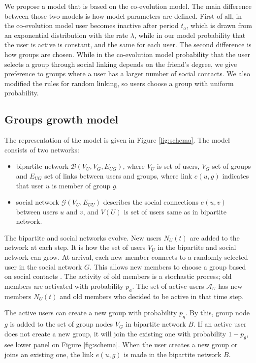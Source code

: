 We propose a model that is based on the co-evolution model. The main difference between those two models is how model parameters are defined. First of all, in the co-evolution model user becomes inactive after period $t_a$, which is drawn from an exponential distribution with the rate $\lambda$, while in our model probability that the user is active is constant, and the same for each user. The second difference is how groups are chosen. While in the co-evolution model probability that the user selects a group through social linking depends on the friend's degree, we give preference to groups where a user has a larger number of social contacts. We also modified the rules for random linking, so users choose a group with uniform probability.

\subsection{Groups growth model}

The representation of the model is given in Figure \ref{fig:schema}. The model consists of two networks:
\begin{itemize}
	\item bipartite network $\mathcal{B}(V_{U}, V_{G}, E_{UG})$, where $V_U$ is set of users, $V_G$ set of groups and $E_{UG}$ set of links between users and groups, where link $e(u,g)$ indicates that user $u$ is member of group $g$.
	\item social network $\mathcal{G}(V_{U},E_{UU})$ describes the social connections $e(u, v)$ between users $u$ and $v$, and  $V(U)$ is set of users same as in bipartite network. 
\end{itemize}

The bipartite and social networks evolve. New users $N_U(t)$ are added to the network at each step. It is how the set of users $V_U$ in the bipartite and social network can grow. At arrival, each new member connects to a randomly selected user in the social network $G$. This allows new members to choose a group based on social contacts \cite{kairam2012life}. The activity of old members is a stochastic process; old members are activated with probability $p_a$. The set of active users $\mathcal{A}_{U}$ has new members $N_U(t)$ and old members who decided to be active in that time step.

The active users can create a new group with probability $p_g$. By this, group node $g$ is added to the set of group nodes $V_G$ in bipartite network $B$. If an active user does not create a new group, it will join the existing one with probability $1-p_g$, see lower panel on Figure \ref{fig:schema}. When the user creates a new group or joins an existing one, the link $e(u,g)$ is made in the bipartite network $B$.

